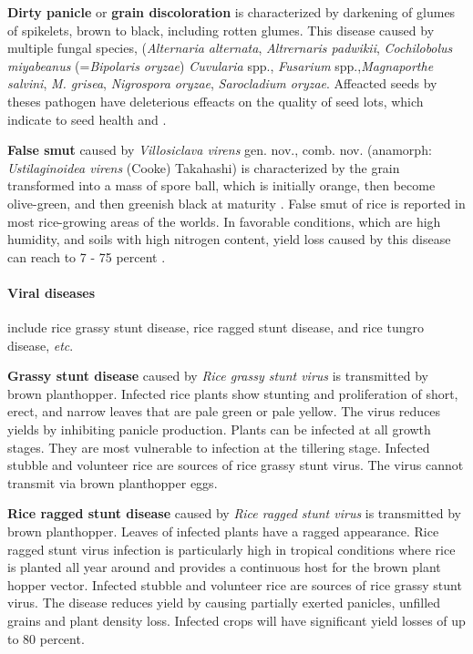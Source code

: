 \documentclass[12pt, oneside]{report}
\begin{document}
\textbf{Dirty panicle} or \textbf{grain discoloration} is characterized by darkening of glumes of spikelets, brown to black, including rotten glumes. This disease caused by multiple fungal species, (\textit{Alternaria alternata}, \textit{Altrernaris padwikii}, \textit{Cochilobolus miyabeanus} (=\textit{Bipolaris oryzae}) \textit{Cuvularia} spp., \textit {Fusarium} spp.,\textit{Magnaporthe salvini}, \textit{M. grisea}, \textit{Nigrospora oryzae}, \textit{Sarocladium oryzae}. Affeacted seeds by theses pathogen have deleterious effeacts on the quality of seed lots, which indicate to seed health \citep{ouricedisease} and \citep{mew2002handbook}. 
 
\textbf{False smut} caused by \textit{Villosiclava virens} gen. nov., comb. nov. (anamorph: \textit{Ustilaginoidea virens} (Cooke) Takahashi) is characterized by the grain transformed into a mass of spore ball, which is initially orange, then become olive-green, and then greenish black at maturity \citep{tanaka2008villosiclava}. False smut of rice is reported in most rice-growing areas of the worlds. In favorable conditions, which are high humidity, and soils with high nitrogen content, yield loss caused by this disease can reach to 7 - 75 percent \citep{irrirkb}.

\paragraph{Viral diseases} include rice grassy stunt disease, rice ragged stunt disease, and rice tungro disease, \textit{etc}. 

\textbf{Grassy stunt disease} caused by \textit{Rice grassy stunt virus} is transmitted by brown planthopper. Infected rice plants show stunting and proliferation of short, erect, and narrow leaves that are pale green or pale yellow. The virus reduces yields by inhibiting panicle production. Plants can be infected at all growth stages. They are most vulnerable to infection at the tillering stage. Infected stubble and volunteer rice are sources of rice grassy stunt virus. The virus cannot transmit via brown planthopper eggs.

\textbf{Rice ragged stunt disease} caused by \textit{Rice ragged stunt virus} is transmitted by brown planthopper. Leaves of infected plants have a ragged appearance. Rice ragged stunt virus infection is particularly high in tropical conditions where rice is planted all year around and provides a continuous host for the brown plant hopper vector. Infected stubble and volunteer rice are sources of rice grassy stunt virus. The disease reduces yield by causing partially exerted panicles, unfilled grains and plant density loss. Infected crops will have significant yield losses of up to 80 percent.
\end{document}
